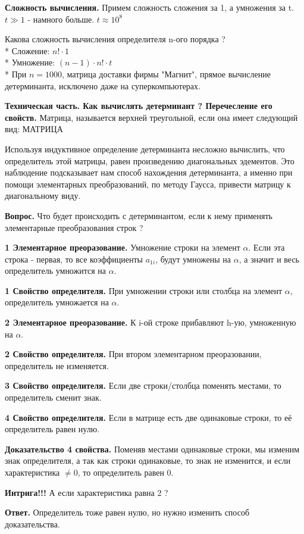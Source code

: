 \documentclass{article}
\begin{document}
{\bf Сложность вычисления.} Примем сложность сложения за 1, а умножения за t. $t\gg1$ - намного больше. $t\approx10^8$

Какова сложность вычисления определителя n-ого порядка ?\\*
Сложение: $n!\cdot1$\\*
Умножение: $(n-1)\cdot n!\cdot t$\\*
При $n=1000$, матрица доставки фирмы "Магнит", прямое вычисление детерминанта, исключено даже на суперкомпьютерах.

{\bf Техническая часть. Как вычислять детерминант ? Перечесление его свойств.} Матрица, называется верхней треугольной, если она имеет следующий вид: МАТРИЦА

Используя индуктивное определение детерминанта несложно вычислить, что определитель этой матрицы, равен произведению диагональных эдементов. Это наблюдение подсказывает нам способ нахождения детерминанта, а именно при помощи элементарных преобразований, по методу Гаусса, привести матрицу к диагональному виду.

{\bf Вопрос.} Что будет происходить с детерминантом, если к нему применять элементарные преобразования строк ?

{\bf 1 Элементарное преоразование.} Умножение строки на элемент $\alpha$. Если эта строка - первая, то все коэффициенты $a_{1i}$, будут умножены на $\alpha$, а значит и весь определитель умножится на $\alpha$.

{\bf 1 Свойство определителя.} При умножении строки или столбца на элемент $\alpha$, определитель умножается на $\alpha$.

{\bf 2 Элементарное преоразование.} К i-ой строке прибавляют h-ую, умноженную на $\alpha$.

{\bf 2 Свойство определителя.} При втором элементарном преоразовании, определитель не изменяется.

{\bf 3 Свойство определителя.} Если две строки/столбца поменять местами, то определитель сменит знак.

{\bf 4 Свойство определителя.} Если в матрице есть две одинаковые строки, то её определитель равен нулю.

{\bf Доказательство 4 свойства.} Поменяв местами  одинаковые строки, мы изменим знак определителя, а так как строки одинаковые, то знак не изменится, и если характеристика $\ne0$, то  определитель равен 0.

{\bf Интрига!!!} А если характеристика равна 2 ?

{\bf Ответ.} Определитель тоже равен нулю, но нужно изменить способ доказательства.
\end{document}
